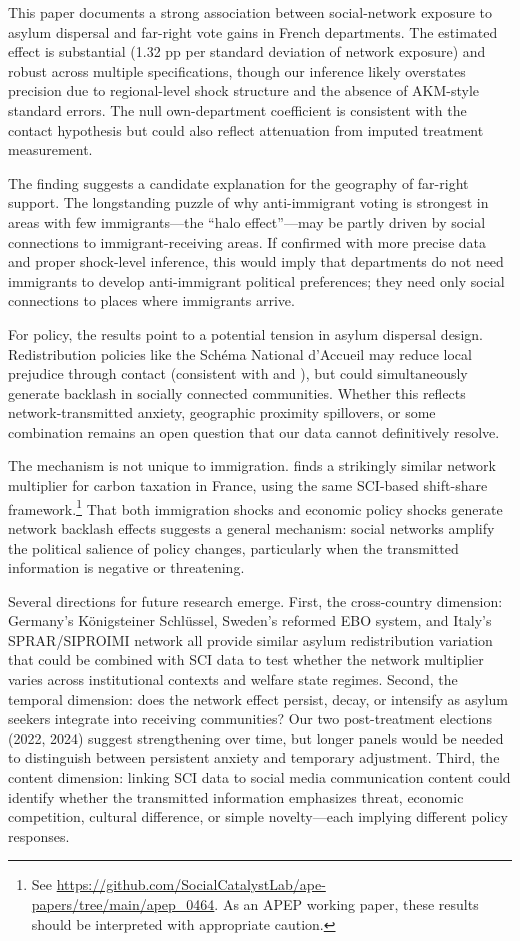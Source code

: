 \documentclass[12pt]{article}
\begin{document}
This paper documents a strong association between social-network exposure to asylum dispersal and far-right vote gains in French departments. The estimated effect is substantial (1.32 pp per standard deviation of network exposure) and robust across multiple specifications, though our inference likely overstates precision due to regional-level shock structure and the absence of AKM-style standard errors. The null own-department coefficient is consistent with the contact hypothesis but could also reflect attenuation from imputed treatment measurement.

The finding suggests a candidate explanation for the geography of far-right support. The longstanding puzzle of why anti-immigrant voting is strongest in areas with few immigrants---the ``halo effect''---may be partly driven by social connections to immigrant-receiving areas. If confirmed with more precise data and proper shock-level inference, this would imply that departments do not need immigrants to develop anti-immigrant political preferences; they need only social connections to places where immigrants arrive.

For policy, the results point to a potential tension in asylum dispersal design. Redistribution policies like the Sch\'ema National d'Accueil may reduce local prejudice through contact (consistent with \citealp{steinmayr2021contact} and \citealp{schneider2024stranger}), but could simultaneously generate backlash in socially connected communities. Whether this reflects network-transmitted anxiety, geographic proximity spillovers, or some combination remains an open question that our data cannot definitively resolve.

The mechanism is not unique to immigration. \citet{apep0464connected} finds a strikingly similar network multiplier for carbon taxation in France, using the same SCI-based shift-share framework.\footnote{See \url{https://github.com/SocialCatalystLab/ape-papers/tree/main/apep_0464}. As an APEP working paper, these results should be interpreted with appropriate caution.} That both immigration shocks and economic policy shocks generate network backlash effects suggests a general mechanism: social networks amplify the political salience of policy changes, particularly when the transmitted information is negative or threatening.

Several directions for future research emerge. First, the cross-country dimension: Germany's K\"onigsteiner Schl\"ussel, Sweden's reformed EBO system, and Italy's SPRAR/SIPROIMI network all provide similar asylum redistribution variation that could be combined with SCI data to test whether the network multiplier varies across institutional contexts and welfare state regimes. Second, the temporal dimension: does the network effect persist, decay, or intensify as asylum seekers integrate into receiving communities? Our two post-treatment elections (2022, 2024) suggest strengthening over time, but longer panels would be needed to distinguish between persistent anxiety and temporary adjustment. Third, the content dimension: linking SCI data to social media communication content could identify whether the transmitted information emphasizes threat, economic competition, cultural difference, or simple novelty---each implying different policy responses.
\end{document}
